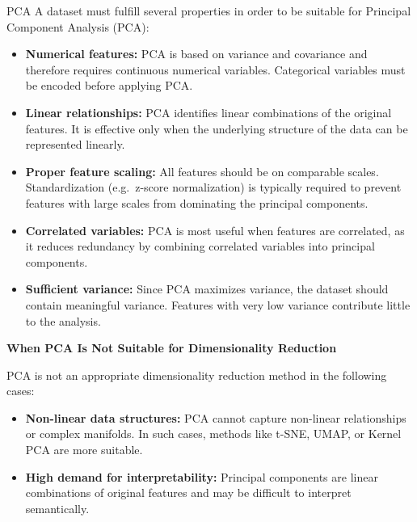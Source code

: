     \begin{exercise}{PCA}
        A dataset must fulfill several properties in order to be suitable for Principal Component Analysis (PCA):

    \begin{itemize}
        \item \textbf{Numerical features:}  
        PCA is based on variance and covariance and therefore requires continuous numerical variables. Categorical variables must be encoded before applying PCA.

        \item \textbf{Linear relationships:}  
        PCA identifies linear combinations of the original features. It is effective only when the underlying structure of the data can be represented linearly.

        \item \textbf{Proper feature scaling:}  
        All features should be on comparable scales. Standardization (e.g.\ z-score normalization) is typically required to prevent features with large scales from dominating the principal components.

        \item \textbf{Correlated variables:}  
        PCA is most useful when features are correlated, as it reduces redundancy by combining correlated variables into principal components.

        \item \textbf{Sufficient variance:}  
        Since PCA maximizes variance, the dataset should contain meaningful variance. Features with very low variance contribute little to the analysis.
    \end{itemize}

    \textbf{When PCA Is Not Suitable for Dimensionality Reduction}

    PCA is not an appropriate dimensionality reduction method in the following cases:

    \begin{itemize}
        \item \textbf{Non-linear data structures:}  
        PCA cannot capture non-linear relationships or complex manifolds. In such cases, methods like t-SNE, UMAP, or Kernel PCA are more suitable.

        \item \textbf{High demand for interpretability:}  
        Principal components are linear combinations of original features and may be difficult to interpret semantically.


\end{itemize}
\end{exercise}
